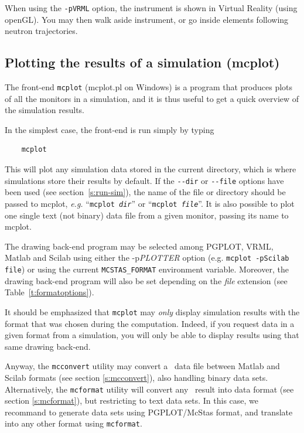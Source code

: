 When using the \verb+-pVRML+ option, the instrument is shown in Virtual Reality (using openGL). You may then walk aside instrument, or go inside elements following neutron trajectories.

\subsection{Plotting the results of a simulation (mcplot)}
\label{s:mcplot}

The front-end \verb+mcplot+ (mcplot.pl on Windows) is a program that produces
plots of all the monitors in a simulation, and it is thus useful to get
a quick overview of the simulation results.

In the simplest case, the front-end is run simply by typing
\begin{verbatim}
    mcplot
\end{verbatim}
This will plot any simulation data stored in the current directory,
which is where simulations store their results by default. If the
\verb+--dir+ or \verb+--file+ options have been used (see
section~\ref{s:run-sim}), the name of the file or directory should be
passed to mcplot, {\em e.g.} ``\texttt{mcplot {\it dir}}'' or ``\texttt{mcplot
  {\it file}}''.
It is also possible to plot one single text (not binary) data file from a given monitor, passing its name to mcplot.

The drawing back-end program may be selected among PGPLOT, VRML, Matlab and Scilab using either the -p{\it PLOTTER} option (e.g. \verb+mcplot -pScilab file+) or using the current \verb+MCSTAS_FORMAT+ environment variable.  Moreover, the drawing back-end program will also be set depending on the {\it file} extension (see Table~\ref{t:formatoptions}).

It should be emphasized that \verb+mcplot+ may \emph{only} display simulation results with the format that was chosen during the computation. Indeed, if you request data in a given format from a simulation, you will only be able to display results using that same drawing back-end.

Anyway, the \verb+mcconvert+ utility may convert a \MCS\ data file between Matlab and Scilab formats (see section \ref{s:mcconvert}), also handling binary data sets. Alternatively, the \verb+mcformat+ utility will convert any \MCS\ result into data format (see section \ref{s:mcformat}), but restricting to text data sets. In this case, we recommand to generate data sets using PGPLOT/McStas format, and translate into any other format using \verb+mcformat+.

